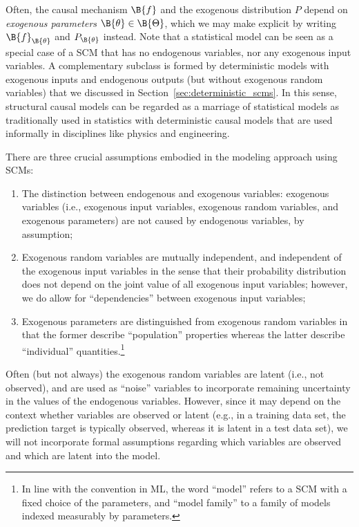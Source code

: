 Often, the causal mechanism $\B{f}$ and the exogenous distribution $P$ depend on 
\emph{exogenous parameters} $\B{\theta}\in\B{\Theta}$, which we may make explicit by writing
$\B{f}_{\B{\theta}}$ and $P_{\B{\theta}}$ instead. Note that a statistical model can
be seen as a special case of a SCM that has no endogenous variables, nor any exogenous
input variables. A complementary subclass is formed by deterministic models with 
exogenous inputs and endogenous outputs (but without exogenous random variables)
that we discussed in Section~\ref{sec:deterministic_scms}. In this sense, structural 
causal models can be regarded as a marriage of statistical models as traditionally used 
in statistics with deterministic causal models that are used informally in disciplines
like physics and engineering.

\begin{Rem}
There are three crucial assumptions embodied in the modeling approach using SCMs:
\begin{enumerate}
  \item The distinction between endogenous and exogenous variables: exogenous variables
    (i.e., exogenous input variables, exogenous random variables, and exogenous parameters)
    are not caused by endogenous variables, by assumption;
  \item Exogenous random variables are mutually independent, and independent of the
    exogenous input variables in the sense that their probability distribution does
    not depend on the joint value of all exogenous input variables; however, we do
    allow for ``dependencies'' between exogenous input variables;
  \item Exogenous parameters are distinguished from exogenous random variables in that
    the former describe ``population'' properties whereas the latter describe ``individual''
    quantities.\footnote{In line with the convention in ML, the word ``model'' refers to a SCM
    with a fixed choice of the parameters, and ``model family'' to a family of models
    indexed measurably by parameters.} 
\end{enumerate}
Often (but not always) the exogenous random variables are latent (i.e., not observed),
and are used as ``noise'' variables to incorporate remaining uncertainty in the values of the endogenous variables.
However, since it may depend on the context whether variables are observed or latent 
(e.g., in a training data set, the prediction target is typically observed, whereas
it is latent in a test data set), we will not incorporate formal assumptions regarding
which variables are observed and which are latent into the model.


\end{Rem}
